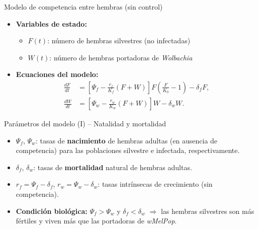 \documentclass[aspectratio=169]{beamer}
\newcommand{\tb}[1]{\textbf{#1}}
\newcommand{\ti}[1]{\textit{#1}}
\begin{document}
\begin{frame}{Modelo de competencia entre hembras (sin control)}
\begin{itemize}
    \item \textbf{Variables de estado:}
    \begin{itemize}
        \item $F(t)$: número de hembras silvestres (no infectadas)
        \item $W(t)$: número de hembras portadoras de \textit{Wolbachia}
    \end{itemize}
    \item \textbf{Ecuaciones del modelo:}
    \begin{align*}
        \frac{dF}{dt} &= \left[\Psi_f - \frac{r_f}{K_f}(F+W)\right] F 
                         \left(\frac{F}{K_0} - 1\right) - \delta_f F,\\
        \frac{dW}{dt} &= \left[\Psi_w - \frac{r_w}{K_w}(F+W)\right] W 
                         - \delta_w W.
    \end{align*}
\end{itemize}

\end{frame}
\begin{frame}{Parámetros del modelo (I) – Natalidad y mortalidad}
\begin{itemize}
    \item $\Psi_f$, $\Psi_w$: tasas de \tb{nacimiento} de hembras adultas 
          (en ausencia de competencia) para las poblaciones silvestre e 
          infectada, respectivamente.
    \item $\delta_f$, $\delta_w$: tasas de \tb{mortalidad} natural de 
          hembras adultas.
    \item $r_f = \Psi_f - \delta_f$, \quad $r_w = \Psi_w - \delta_w$: 
          tasas intrínsecas de crecimiento (sin competencia).
    \item \textbf{Condición biológica:}  
          $\Psi_f > \Psi_w$ \quad y \quad $\delta_f < \delta_w$  
          $\Rightarrow$ las hembras silvestres son más fértiles y viven más 
          que las portadoras de \ti{wMelPop}.
\end{itemize}
\end{frame}
\end{document}
